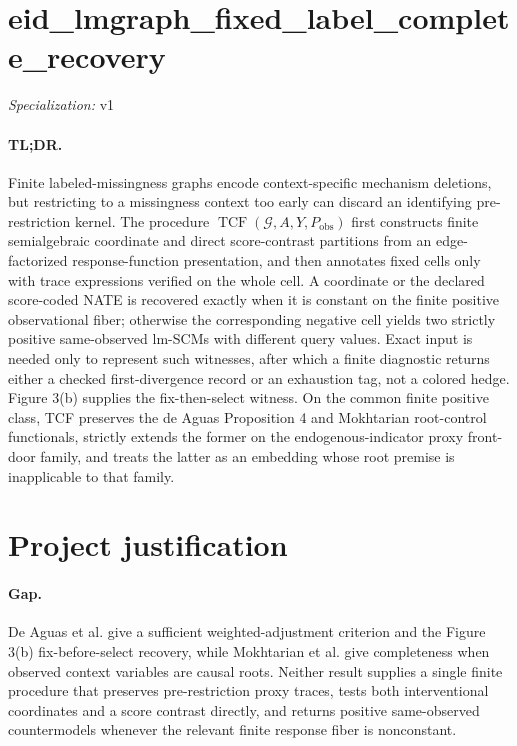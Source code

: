 \documentclass{article}
\begin{document}
\sloppy

\section*{eid\_\allowbreak{}lmgraph\_\allowbreak{}fixed\_\allowbreak{}label\_\allowbreak{}complete\_\allowbreak{}recovery}

\noindent\textit{Specialization:} v1\par

\paragraph{TL;DR.} Finite labeled-missingness graphs encode context-specific mechanism deletions, but restricting to a missingness context too early can discard an identifying pre-restriction kernel. The procedure \(\operatorname{TCF}(\mathcal G,A,Y,P_{\mathrm{obs}})\) first constructs finite semialgebraic coordinate and direct score-contrast partitions from an edge-factorized response-function presentation, and then annotates fixed cells only with trace expressions verified on the whole cell. A coordinate or the declared score-coded NATE is recovered exactly when it is constant on the finite positive observational fiber; otherwise the corresponding negative cell yields two strictly positive same-observed lm-SCMs with different query values. Exact input is needed only to represent such witnesses, after which a finite diagnostic returns either a checked first-divergence record or an exhaustion tag, not a colored hedge. Figure 3(b) supplies the fix-then-select witness. On the common finite positive class, TCF preserves the de Aguas Proposition 4 and Mokhtarian root-control functionals, strictly extends the former on the endogenous-indicator proxy front-door family, and treats the latter as an embedding whose root premise is inapplicable to that family.

\section{Project justification}

\paragraph{Gap.} De Aguas et al. give a sufficient weighted-adjustment criterion and the Figure 3(b) fix-before-select recovery, while Mokhtarian et al. give completeness when observed context variables are causal roots. Neither result supplies a single finite procedure that preserves pre-restriction proxy traces, tests both interventional coordinates and a score contrast directly, and returns positive same-observed countermodels whenever the relevant finite response fiber is nonconstant.
\end{document}
